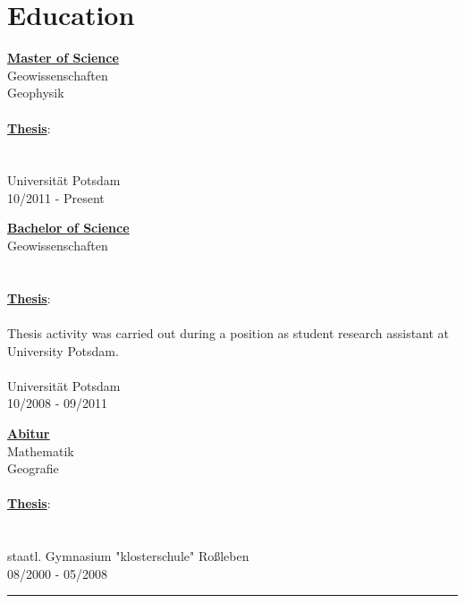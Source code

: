 \documentclass{article}
\begin{document}
\begin{minipage}[t]{0.7\textwidth}
		\section*{\fontsize{18pt}{24pt}\selectfont \color{pblue} Education}
		\begin{minipage}{0.3\textwidth}
	\textbf{\underline{Master of Science}} \faHourglassHalf\\
	Geowissenschaften\\
	Geophysik\\\\
	\textbf{\underline{Thesis}}:\\\\\\
	Universität Potsdam\\
	10/2011 - Present
		\end{minipage}
		\hfill
		\begin{minipage}{0.3\textwidth}
	\textbf{\underline{\href{https://www.dropbox.com/s/297g1chiby8mrd3/Bachelor-Certificate.pdf?dl=0}{Bachelor of Science}}} \faGraduationCap\\
	Geowissenschaften\\\\\\
	\textbf{\underline{Thesis}}:\\
	\href{https://www.dropbox.com/s/3kngo4hpb0c47ww/Bachelorarbeit.pdf?dl=0}{}\\
	    Thesis activity was carried out during a position as student research assistant at University Potsdam.\\\\
Universität Potsdam\\
{10/2008 - 09/2011}
		\end{minipage}
		\hfill
		\begin{minipage}{0.3\textwidth}
	\textbf{\underline{\href{https://www.dropbox.com/s/nsgmvy7o64xb9si/Abiturzeugnis.pdf?dl=0}{Abitur}}} \faGraduationCap\\
	Mathematik\\
	Geografie\\\\
	\textbf{\underline{Thesis}}:\\
	 \\\\
staatl. Gymnasium "klosterschule" Roßleben\\
08/2000 - 05/2008
		\end{minipage}
		\hrule

\end{minipage}
\end{document}
